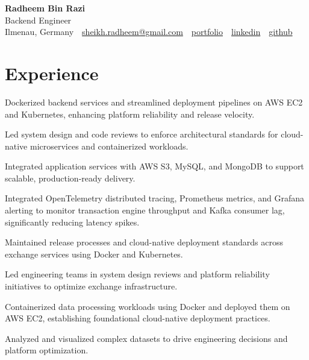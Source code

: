 \documentclass[10pt,a4paper]{resume}
\makeatletter
\newcommand{\Portfolio}{https://radheem.github.io/my-cv}
\newcommand{\PortfolioText}{portfolio}
\newcommand{\GitHub}{https://github.com/radheem}
\newcommand{\LinkedIn}{https://www.linkedin.com/in/radheem-razi}
\newcommand{\Email}{sheikh.radheem@gmail.com}
\makeatother
\begin{document}
\begin{center}
  {\huge\bfseries Radheem Bin Razi}\\[3pt]
  {\large Backend Engineer}\\[6pt]
  \small
  Ilmenau, Germany \,\textbar\,
  \href{mailto:\Email}{\Email} \,\textbar\,
  \href{\Portfolio}{\PortfolioText} \,\textbar\,
  \href{\LinkedIn}{linkedin} \,\textbar\,
  \href{\GitHub}{github}
\end{center}
\vspace{2pt}

\section{Experience}

\bullets
  \item Dockerized backend services and streamlined deployment pipelines on AWS EC2 and Kubernetes, enhancing platform reliability and release velocity.
  \item Led system design and code reviews to enforce architectural standards for cloud-native microservices and containerized workloads.
  \item Integrated application services with AWS S3, MySQL, and MongoDB to support scalable, production-ready delivery.
\bulletsend
\vspace{1.5pt}
\bullets
  \item Integrated OpenTelemetry distributed tracing, Prometheus metrics, and Grafana alerting to monitor transaction engine throughput and Kafka consumer lag, significantly reducing latency spikes.
  \item Maintained release processes and cloud-native deployment standards across exchange services using Docker and Kubernetes.
  \item Led engineering teams in system design reviews and platform reliability initiatives to optimize exchange infrastructure.
\bulletsend
\vspace{1.5pt}
\bullets
  \item Containerized data processing workloads using Docker and deployed them on AWS EC2, establishing foundational cloud-native deployment practices.
  \item Analyzed and visualized complex datasets to drive engineering decisions and platform optimization.
\bulletsend
\vspace{1.5pt}
\end{document}
